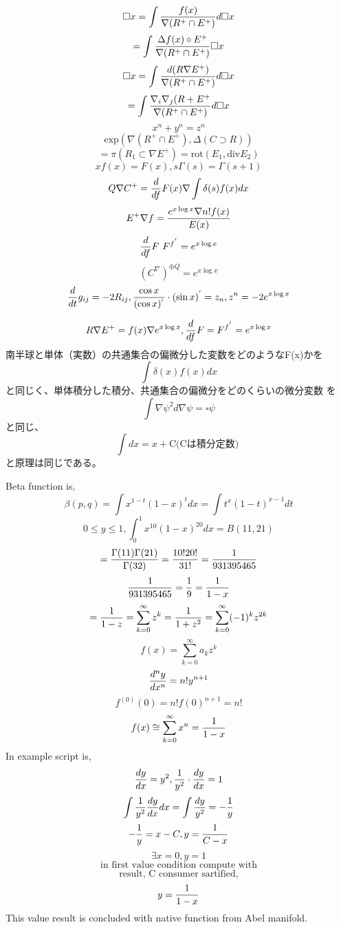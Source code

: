 \documentclass{jsarticle}
\begin{document}
      $$ \square x = \int {f(x) \over {\nabla(R^{+}\cap E^{+})}}d \square x$$
      $$= \int {{\Delta f(x) \circ E^{+}} \over {\nabla(R^{+}\cap E^{+})}}
      \square x $$
      $$ \square x = \int {d(R \nabla E^{+}) \over {\nabla(R^{+} \cap E^{+})}}
      d \square x $$
      $$ = \int {{\nabla_{i} \nabla_{j} (R + E^{+}} \over {\nabla(R^{+}
      \cap  E^{+})}}d \square x $$
      $$ x^n + y^n = z^n $$
      $$ \mathrm{exp}(\nabla(R^{+}\cap E^{+}),\Delta(C \supset R)) $$
      $$ = \pi (R_1 \subset \nabla E^{+}) = \mathrm{rot}(E_1, 
      \mathrm{div}E_2) $$
      $$ xf(x) = F(x), s\Gamma(s) = \Gamma(s+1) $$
      $$ Q \nabla C^{+} = {d \over df}F(x) \nabla \int \delta(s)f(x)dx $$
      $$ E^{+}\nabla f = {{e^{x \log x} \nabla n! f(x)} \over {E(x)}} $$
      $$ {d \over df}F ~ F^{{f}^{'}} = e^{x \log x} $$
      $$ (C^{\nabla})^{\oplus Q} = e^{x \log x} $$
      $$ {d \over dt}g_{ij} = - 2 R_{ij}, {\cos x \over (\cos x)^{'}}
      \cdot (\sin x)^{'} = z_n, z^n = - 2 e^{x \log x} $$

      $$ R \nabla E^{+} = f(x) \nabla e^{x \log x}, {d \over df}F = F^{
	      {f}^{'}} = e^{x \log x}  $$
      南半球と単体（実数）の共通集合の偏微分した変数をどのようなF(x)かを
      $$ \int \delta(x)f(x)dx $$
      と同じく、単体積分した積分、共通集合の偏微分をどのくらいの微分変数
      を
      $$ \int \nabla \psi^2 d \nabla \psi = \square \psi $$
      と同じ、
      $$ \int dx = x + \text{C(Cは積分定数) }$$
      と原理は同じである。


      Beta function is,
      $$ \beta(p,q) = \int x^{1 - t} (1 - x)^{t}dx = \int t^{x}(1 - t)^{x - 1}
      dt $$
      $$ 0 \le y \le 1, \int^{1}_{0} x^{10}(1 - x)^{20}dx = B(11,21) $$
      $$ = {{\Gamma(11)\Gamma(21)} \over \Gamma(32)} = {{10! 20!} \over {
	      31!}} = {1 \over {931395465}} $$
       $$ {1 \over {931395465}} = {1 \over 9} = {1 \over {1 - x}} $$
	 $$     = {1 \over {1 - z}} =
	      \sum_{k=0}^{\infty}z^k = {1 \over {1 + z^2}} = \sum_{
		      k=0}^{\infty} (-1)^k z^{2k} $$
      $$ f(x) = \sum_{k=0}^{\infty} a_k z^k $$
      $$ {{d^n y} \over dx^n} = n! y^{n+1} $$
      $$ f^{(0)}(0) = n!f(0)^{n+1} = n! $$
      $$ f(x) \cong \sum_{k=0}^{\infty}x^n = {1 \over {1 - x}} $$
      In example script is,
      $$ {{dy} \over dx} = y^2, {1 \over y^2}\cdot {dy \over dx} = 1 $$
      $$ \int {1 \over y^2}{dy \over dx}dx = \int{dy \over y^2} = - {1 \over y
      } $$
      $$ - {1 \over y} = x - C, y = {1 \over {C - x}} $$
      $$ \exists x = 0, y = 1 $$
      $$\text{in first value condition compute with} $$
      $$ \text{result, C consumer sartified,} $$
      $$ y = {1 \over {1 - x}} $$
      This value result is concluded with native function from Abel manifold.
\end{document}

